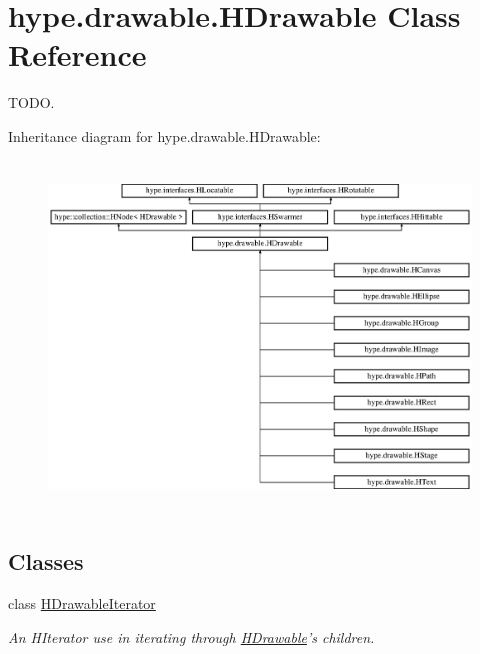 \hypertarget{classhype_1_1drawable_1_1_h_drawable}{\section{hype.\-drawable.\-H\-Drawable Class Reference}
\label{classhype_1_1drawable_1_1_h_drawable}
}


T\-O\-D\-O.  


Inheritance diagram for hype.\-drawable.\-H\-Drawable\-:\begin{figure}[H]
\begin{center}
\leavevmode
\includegraphics[height=9.333334cm]{classhype_1_1drawable_1_1_h_drawable}
\end{center}
\end{figure}
\subsection*{Classes}
\begin{DoxyCompactItemize}
\item 
class \hyperlink{classhype_1_1drawable_1_1_h_drawable_1_1_h_drawable_iterator}{H\-Drawable\-Iterator}
\begin{DoxyCompactList}\small\item\em An H\-Iterator use in iterating through \hyperlink{classhype_1_1drawable_1_1_h_drawable}{H\-Drawable}'s children. \end{DoxyCompactList}\end{DoxyCompactItemize}
